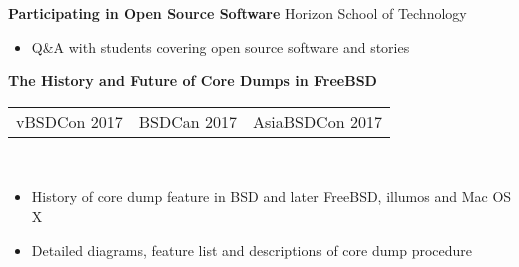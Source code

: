 \documentclass[resmargin,line,12pt]{res}
\begin{document}
{\begin{resume}
\color{black}
{\bf Participating in Open Source Software} Horizon School of Technology \\
\vspace{-.16in}
\begin{itemize}
  \item Q\&A with students covering open source software and stories
\end{itemize}
\vspace{-.10in}

\color{black}
{\bf The History and Future of Core Dumps in FreeBSD} \\
\begin{tabular}{l l l}
      vBSDCon 2017 & BSDCan 2017 & AsiaBSDCon 2017
\end{tabular}
\\
\vspace{-.16in}
\begin{itemize}
  \item History of core dump feature in BSD and later FreeBSD, illumos and Mac OS X
  \item Detailed diagrams, feature list and descriptions of core dump procedure
\end{itemize}
\vspace{-.10in}



\end{resume}}
\end{document}
